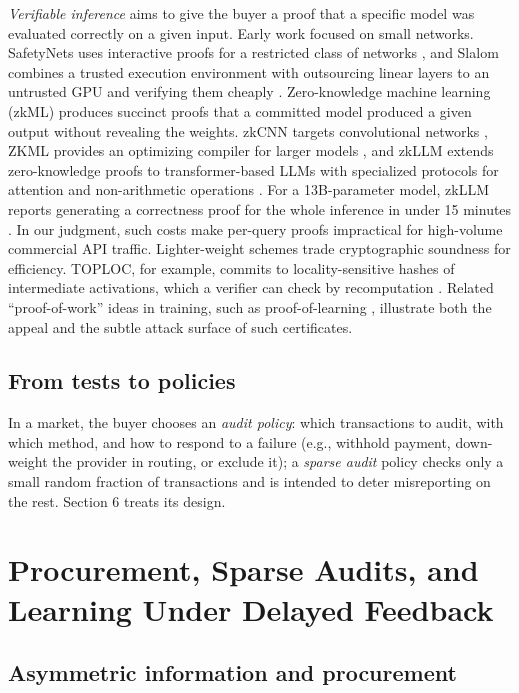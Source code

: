 \documentclass[sigconf]{acmart}
\begin{document}
\emph{Verifiable inference} aims to give the buyer a proof that a specific model was evaluated correctly on a given input. Early work focused on small networks. SafetyNets uses interactive proofs for a restricted class of networks \cite{ghodsi2017safetynets}, and Slalom combines a trusted execution environment with outsourcing linear layers to an untrusted GPU and verifying them cheaply \cite{tramer2019slalom}. Zero-knowledge machine learning (zkML) produces succinct proofs that a committed model produced a given output without revealing the weights. zkCNN targets convolutional networks \cite{liu2021zkcnn}, ZKML provides an optimizing compiler for larger models \cite{chen2024zkml}, and zkLLM extends zero-knowledge proofs to transformer-based LLMs with specialized protocols for attention and non-arithmetic operations \cite{sun2024zkllm}. For a 13B-parameter model, zkLLM reports generating a correctness proof for the whole inference in under 15 minutes \cite{sun2024zkllm}. In our judgment, such costs make per-query proofs impractical for high-volume commercial API traffic. Lighter-weight schemes trade cryptographic soundness for efficiency. TOPLOC, for example, commits to locality-sensitive hashes of intermediate activations, which a verifier can check by recomputation \cite{ong2025toploc}. Related ``proof-of-work'' ideas in training, such as proof-of-learning \cite{jia2021pol}, illustrate both the appeal and the subtle attack surface of such certificates.

\subsection{From tests to policies}\label{from-tests-to-policies}

In a market, the buyer chooses an \emph{audit policy}: which transactions to audit, with which method, and how to respond to a failure (e.g., withhold payment, down-weight the provider in routing, or exclude it); a \emph{sparse audit} policy checks only a small random fraction of transactions and is intended to deter misreporting on the rest. Section 6 treats its design.

\section{Procurement, Sparse Audits, and Learning Under Delayed Feedback}\label{procurement-sparse-audits-and-learning-under-delayed-feedback}

\subsection{Asymmetric information and procurement}\label{asymmetric-information-and-procurement}
\end{document}
